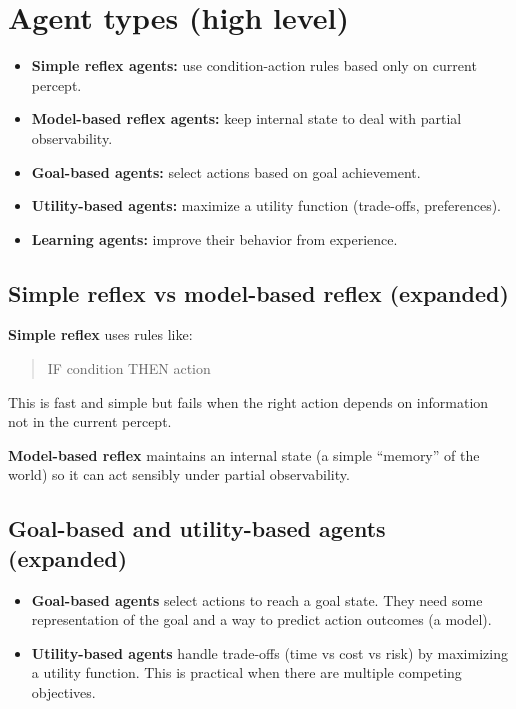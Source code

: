 \documentclass[11pt]{article}
\begin{document}
\section{Agent types (high level)}
\begin{itemize}[leftmargin=*]
  \item \textbf{Simple reflex agents:} use condition-action rules based only on current percept.
  \item \textbf{Model-based reflex agents:} keep internal state to deal with partial observability.
  \item \textbf{Goal-based agents:} select actions based on goal achievement.
  \item \textbf{Utility-based agents:} maximize a utility function (trade-offs, preferences).
  \item \textbf{Learning agents:} improve their behavior from experience.
\end{itemize}

\subsection{Simple reflex vs model-based reflex (expanded)}
\textbf{Simple reflex} uses rules like:
\begin{quote}
IF condition THEN action
\end{quote}
This is fast and simple but fails when the right action depends on information not in the current percept.

\textbf{Model-based reflex} maintains an internal state (a simple ``memory'' of the world) so it can act sensibly under partial observability.

\subsection{Goal-based and utility-based agents (expanded)}
\begin{itemize}[leftmargin=*]
  \item \textbf{Goal-based agents} select actions to reach a goal state. They need some representation of the goal and a way to predict action outcomes (a model).
  \item \textbf{Utility-based agents} handle trade-offs (time vs cost vs risk) by maximizing a utility function. This is practical when there are multiple competing objectives.
\end{itemize}
\end{document}
